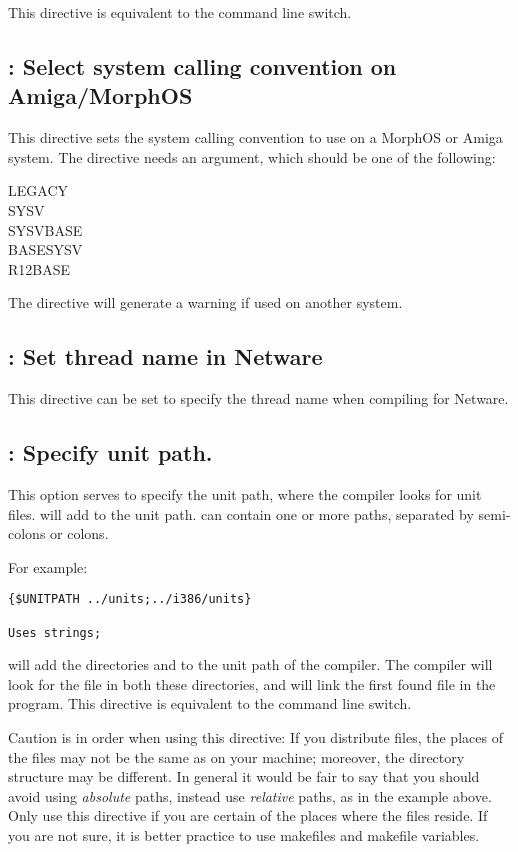 This directive is equivalent to the  command line switch.

\subsection{ : Select system calling convention on Amiga/MorphOS}
This directive sets the system calling convention to use on a MorphOS or
Amiga system. The directive needs an argument, which should be one of the
following:
\begin{description}
\item[LEGACY]
\item[SYSV]
\item[SYSVBASE]
\item[BASESYSV]
\item[R12BASE]
\end{description}
The directive will generate a warning if used on another system.

\subsection{ : Set thread name in Netware}
This directive can be set to specify the thread name when compiling for
Netware. 

\subsection{ : Specify unit path.}

This option serves to specify the unit path, where the compiler looks for
unit files.  will add  to the unit
path.  can contain one or more paths, separated by semi-colons or
colons.

For example:
\begin{verbatim}
{$UNITPATH ../units;../i386/units}

Uses strings;
\end{verbatim}

will add the directories  and  to the unit
path of the compiler. The compiler will look for the file 
in both these directories, and will link the first found file in the
program. This directive is equivalent to the  command line switch.

Caution is in order when using this directive: If you distribute files, the
places of the files may not be the same as on your machine; moreover, the
directory structure may be different. In general it would be fair to say
that you should avoid using {\em absolute} paths, instead use {\em relative}
paths, as in the example above. Only use this directive if you are certain
of the places where the files reside. If you are not sure, it is better
practice to use makefiles and makefile variables.

